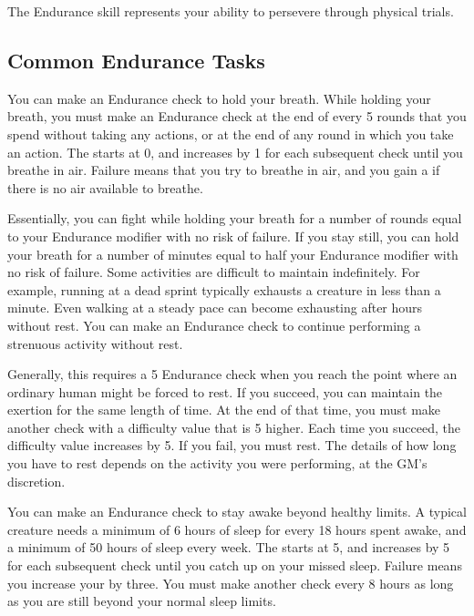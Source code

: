 \newpage
{}
    The Endurance skill represents your ability to persevere through physical trials.

    \subsection{Common Endurance Tasks}
        \label{Hold Breath}
        You can make an Endurance check to hold your breath.
        While holding your breath, you must make an Endurance check at the end of every 5 rounds that you spend without taking any actions, or at the end of any round in which you take an action.
        The  starts at 0, and increases by 1 for each subsequent check until you breathe in air.
        Failure means that you try to breathe in air, and you gain a  if there is no air available to breathe.

        Essentially, you can fight while holding your breath for a number of rounds equal to your Endurance modifier with no risk of failure.
        If you stay still, you can hold your breath for a number of minutes equal to half your Endurance modifier with no risk of failure.
        \label{Maintain Exertion}
        Some activities are difficult to maintain indefinitely.
        For example, running at a dead sprint typically exhausts a creature in less than a minute.
        Even walking at a steady pace can become exhausting after hours without rest.
        You can make an Endurance check to continue performing a strenuous activity without rest.

        Generally, this requires a  5 Endurance check when you reach the point where an ordinary human might be forced to rest.
        If you succeed, you can maintain the exertion for the same length of time.
        At the end of that time, you must make another check with a difficulty value that is 5 higher.
        Each time you succeed, the difficulty value increases by 5.
        If you fail, you must rest.
        The details of how long you have to rest depends on the activity you were performing, at the GM's discretion.

        \label{Stay Awake} You can make an Endurance check to stay awake beyond healthy limits.
        A typical creature needs a minimum of 6 hours of sleep for every 18 hours spent awake, and a minimum of 50 hours of sleep every week.
        The  starts at 5, and increases by 5 for each subsequent check until you catch up on your missed sleep.
        Failure means you increase your  by three.
        You must make another check every 8 hours as long as you are still beyond your normal sleep limits.

